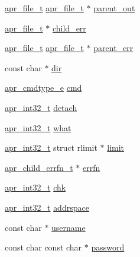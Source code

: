\begin{DoxyCompactItemize}
\hyperlink{structapr__file__t}{apr\+\_\+file\+\_\+t} \hyperlink{structapr__file__t}{apr\+\_\+file\+\_\+t} $\ast$ \hyperlink{group__apr__thread__proc_ga1b49f722278b0ec3437cc5c2b5e2a72c}{parent\+\_\+out}
\item 
\hyperlink{structapr__file__t}{apr\+\_\+file\+\_\+t} $\ast$ \hyperlink{group__apr__thread__proc_ga9834c9c3408428e4952109d5c71fd7e5}{child\+\_\+err}
\item 
\hyperlink{structapr__file__t}{apr\+\_\+file\+\_\+t} \hyperlink{structapr__file__t}{apr\+\_\+file\+\_\+t} $\ast$ \hyperlink{group__apr__thread__proc_gaefc372e9017d6fa2901e328aeed72329}{parent\+\_\+err}
\item 
const char $\ast$ \hyperlink{group__apr__thread__proc_gacfc1a53c655495af614ea7dab4aff62c}{dir}
\item 
\hyperlink{group__apr__thread__proc_gadcb981d7748c580eb69ac11dbf709060}{apr\+\_\+cmdtype\+\_\+e} \hyperlink{group__apr__thread__proc_ga7b715f5a87a71c6766684c1798251237}{cmd}
\item 
\hyperlink{group__apr__platform_ga21ef1e35fd3ff9be386f3cb20164ff02}{apr\+\_\+int32\+\_\+t} \hyperlink{group__apr__thread__proc_gadcebad0a3a84fb6fd849906b806a09f6}{detach}
\item 
\hyperlink{group__apr__platform_ga21ef1e35fd3ff9be386f3cb20164ff02}{apr\+\_\+int32\+\_\+t} \hyperlink{group__apr__thread__proc_gaf132f350c1657f61f533df7066e903c4}{what}
\item 
\hyperlink{group__apr__platform_ga21ef1e35fd3ff9be386f3cb20164ff02}{apr\+\_\+int32\+\_\+t} struct rlimit $\ast$ \hyperlink{group__apr__thread__proc_ga915cb5b6b271c146b5198c51cff16f9a}{limit}
\item 
\hyperlink{group__apr__thread__proc_ga428aa21a05476068f95d9ee30d1b420a}{apr\+\_\+child\+\_\+errfn\+\_\+t} $\ast$ \hyperlink{group__apr__thread__proc_ga2f0d60ad743726f6dced4ea651eaad0c}{errfn}
\item 
\hyperlink{group__apr__platform_ga21ef1e35fd3ff9be386f3cb20164ff02}{apr\+\_\+int32\+\_\+t} \hyperlink{group__apr__thread__proc_ga80bcf89f53ad05f2ee5d03d947d8e4a4}{chk}
\item 
\hyperlink{group__apr__platform_ga21ef1e35fd3ff9be386f3cb20164ff02}{apr\+\_\+int32\+\_\+t} \hyperlink{group__apr__thread__proc_ga5d1a835b28fa59b3bcc57347a3f0e419}{addrspace}
\item 
const char $\ast$ \hyperlink{group__apr__thread__proc_gaba2dfcdfda80edcb531a5a7115d3e043}{username}
\item 
const char const char $\ast$ \hyperlink{group__apr__thread__proc_ga0a8fa1eb99a9666b9600f8eb7212e348}{password}

\end{DoxyCompactItemize}
